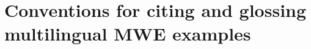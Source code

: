 \documentclass[output=paper,
modfonts,
]{langscibook}
\begin{document}





\section{Conventions for citing and glossing multilingual MWE examples}
\end{document}
